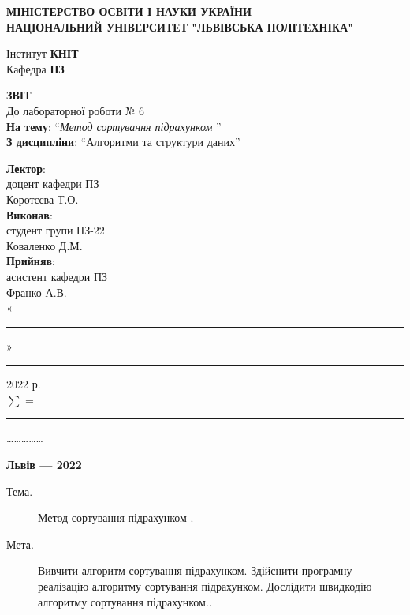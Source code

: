 \documentclass{article}
\newcommand\subject{Алгоритми та структури даних}
\newcommand\lecturer{доцент кафедри ПЗ\\Коротєєва Т.О.}
\newcommand\teacher{асистент кафедри ПЗ\\Франко А.В.}
\newcommand\mygroup{ПЗ-22}
\newcommand\lab{6}
\newcommand\theme{Метод сортування підрахунком }
\newcommand\purpose{Вивчити алгоритм сортування підрахунком. Здійснити програмну реалізацію алгоритму сортування підрахунком. Дослідити швидкодію алгоритму сортування підрахунком.}
\begin{document}
	\begin{normalsize}
		\begin{titlepage}
			\thispagestyle{empty}
			\begin{center}
				\textbf{МІНІСТЕРСТВО ОСВІТИ І НАУКИ УКРАЇНИ\\
					НАЦІОНАЛЬНИЙ УНІВЕРСИТЕТ "ЛЬВІВСЬКА ПОЛІТЕХНІКА"}
			\end{center}
			\begin{flushright}
				Інститут \textbf{КНІТ}\\
				Кафедра \textbf{ПЗ}
			\end{flushright}
			\vspace{200pt}
			\begin{center}
				\textbf{ЗВІТ}\\
				\vspace{10pt}
				До лабораторної роботи № \lab\\
				\textbf{На тему}: “\textit{\theme}”\\
				\textbf{З дисципліни}: “\subject”
			\end{center}
			\vspace{112pt}
			\begin{flushright}
				
				\textbf{Лектор}:\\
				\lecturer\\
				\vspace{28pt}
				\textbf{Виконав}:\\
				
				студент групи \mygroup\\
				Коваленко Д.М.\\
				\vspace{28pt}
				\textbf{Прийняв}:\\
				
				\teacher\\
				
				\vspace{28pt}
				«\rule{1cm}{0.15mm}» \rule{1.5cm}{0.15mm} 2022 р.\\
				$\sum$ = \rule{1cm}{0.15mm}……………\\
				
			\end{flushright}
			\vspace{\fill}
			\begin{center}
				\textbf{Львів — 2022}
			\end{center}
		\end{titlepage}
		
		\begin{description}
			\item[Тема.] \theme.
			\item[Мета.] \purpose.
		\end{description}
		

\end{normalsize}
\end{document}
